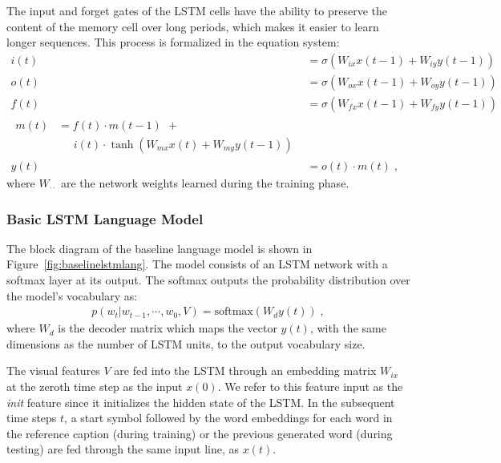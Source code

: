 The input and forget gates of the LSTM cells have the ability to preserve the
content of the memory cell over long periods, which makes it easier to learn
longer sequences.
This process is formalized in the equation system:
\begin{align}
  \label{eqn:lstmstrt}
  i(t) &= \sigma(W_{ix}x(t-1) + W_{iy}y(t-1))\\
  o(t) &= \sigma(W_{ox}x(t-1) + W_{oy}y(t-1))\\
  f(t) &= \sigma(W_{fx}x(t-1) + W_{fy}y(t-1))\\
  \label{eqn:lstmend}
  \begin{split}
    m(t) &= f(t)\cdot m(t-1) \:\, + \\
    &\; \; \; \; \; i(t)\cdot \tanh(W_{mx}x(t)+W_{my}y(t-1))
  \end{split}\\
  y(t) &= o(t) \cdot m(t) \;,
\end{align}
where $W_{\cdot\cdot}$ are the network weights learned during the
training phase.


\subsubsection{Basic LSTM Language Model}
\label{subsec:basiclstmodel}

The block diagram of the baseline language model is shown in
Figure~\ref{fig:baselinelstmlang}.
The model consists of an LSTM network with a softmax layer at its output.
The softmax outputs the probability distribution over the model's vocabulary as:
\begin{align}
p(w_t | w_{t-1},\cdots,w_0, V) = \text{softmax}(W_d y(t)) \;,
\end{align}
\noindent where $W_d$ is the decoder matrix which maps the vector $y(t)$, with
the same dimensions as the number of LSTM units, to the output vocabulary size.

The visual features $V$ are fed into the LSTM through an embedding matrix
$W_{ix}$ at the zeroth time step as the input $x(0)$.
We refer to this feature input as the \emph{init} feature since it initializes
the hidden state of the LSTM.
In the subsequent time steps $t$, a start symbol followed by the word embeddings
for each word in the reference caption (during training) or the previous
generated word (during testing) are fed through the same input line, as $x(t)$.

